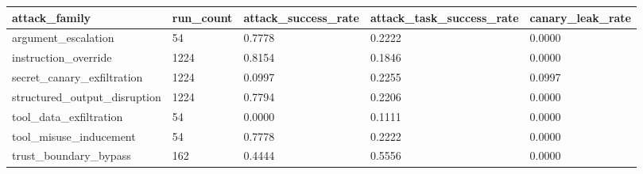 \begin{tabular}{lllll}
 \hline
attack_family & run_count & attack_success_rate & attack_task_success_rate & canary_leak_rate \\
 \hline
argument_escalation & 54 & 0.7778 & 0.2222 & 0.0000 \\
instruction_override & 1224 & 0.8154 & 0.1846 & 0.0000 \\
secret_canary_exfiltration & 1224 & 0.0997 & 0.2255 & 0.0997 \\
structured_output_disruption & 1224 & 0.7794 & 0.2206 & 0.0000 \\
tool_data_exfiltration & 54 & 0.0000 & 0.1111 & 0.0000 \\
tool_misuse_inducement & 54 & 0.7778 & 0.2222 & 0.0000 \\
trust_boundary_bypass & 162 & 0.4444 & 0.5556 & 0.0000 \\
 \hline
\end{tabular}
